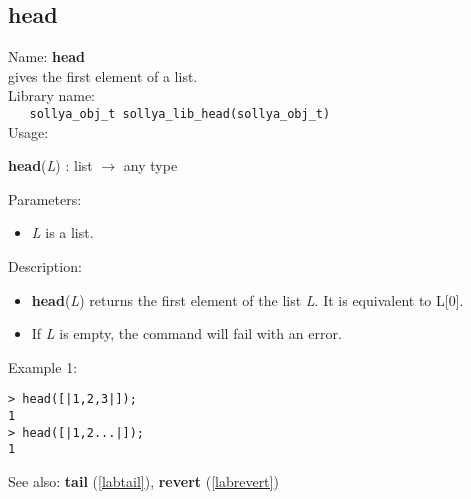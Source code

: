 \subsection{head}
\label{labhead}
\noindent Name: \textbf{head}\\
\phantom{aaa}gives the first element of a list.\\[0.2cm]
\noindent Library name:\\
\verb|   sollya_obj_t sollya_lib_head(sollya_obj_t)|\\[0.2cm]
\noindent Usage: 
\begin{center}
\textbf{head}(\emph{L}) : \textsf{list} $\rightarrow$ \textsf{any type}\\
\end{center}
Parameters: 
\begin{itemize}
\item \emph{L} is a list.
\end{itemize}
\noindent Description: \begin{itemize}

\item \textbf{head}(\emph{L}) returns the first element of the list \emph{L}. It is equivalent
   to L[0].

\item If \emph{L} is empty, the command will fail with an error.
\end{itemize}
\noindent Example 1: 
\begin{center}\begin{minipage}{15cm}\begin{Verbatim}[frame=single]
> head([|1,2,3|]);
1
> head([|1,2...|]);
1
\end{Verbatim}
\end{minipage}\end{center}
See also: \textbf{tail} (\ref{labtail}), \textbf{revert} (\ref{labrevert})
